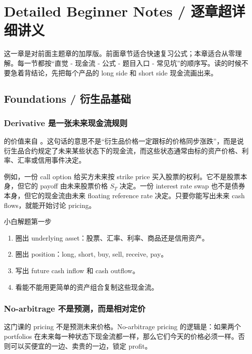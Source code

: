 \chapter{Detailed Beginner Notes / 逐章超详细讲义}

这一章是对前面主题章的加厚版。前面章节适合快速复习公式；本章适合从零理解。每一节都按“直觉 - 现金流 - 公式 - 题目入口 - 常见坑”的顺序写。读的时候不要急着背结论，先把每个产品的 long side 和 short side 现金流画出来。

\section{Foundations / 衍生品基础}

\subsection{Derivative 是一张未来现金流规则}
 的价值来自 。这句话的意思不是“衍生品价格一定跟标的价格同步涨跌”，而是说衍生品合约规定了未来某些状态下的现金流，而这些状态通常由标的资产价格、利率、汇率或信用事件决定。

例如，一份 call option 给买方未来按 strike price 买入股票的权利。它不是股票本身，但它的 payoff 由未来股票价格 $S_T$ 决定。一份 interest rate swap 也不是债券本身，但它的现金流由未来 floating reference rate 决定。只要你能写出未来 cash flows，就能开始讨论 pricing。

\begin{workflowbox}{小白解题第一步}
\begin{enumerate}
  \item 圈出 underlying asset：股票、汇率、利率、商品还是信用资产。
  \item 圈出 position：long, short, buy, sell, receive, pay。
  \item 写出 future cash inflow 和 cash outflow。
  \item 看能不能用更简单的资产组合复制这些现金流。
\end{enumerate}
\end{workflowbox}

\subsection{No-arbitrage 不是预测，而是相对定价}
这门课的 pricing 不是预测未来价格。No-arbitrage pricing 的逻辑是：如果两个 portfolios 在未来每一种状态下现金流都一样，那么它们今天的价格必须一样。否则可以买便宜的一边、卖贵的一边，锁定 profit。

